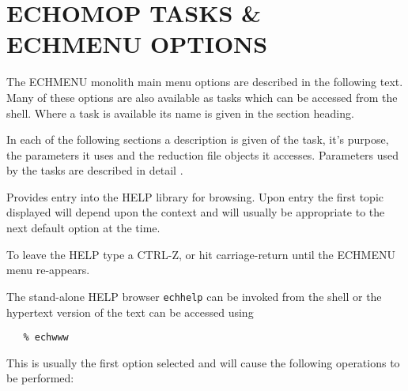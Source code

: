 \section{ECHOMOP TASKS \& ECHMENU OPTIONS}

The ECHMENU monolith main menu options are described in the following text.
Many of these options are also available as tasks which can be
accessed from the shell.  Where a task is available its name is given in the
section heading.

In each of the following sections a description is given of the task, it's
purpose, the parameters it uses and the reduction file objects it accesses.
Parameters used by the tasks are described in detail
\@.



Provides entry into the HELP library for browsing. Upon entry the first
topic displayed will depend upon the context and will usually be
appropriate to the next default option at the time.

To leave the HELP type a CTRL-Z, or hit carriage-return until the
ECHMENU menu re-appears.

The stand-alone HELP browser \verb+echhelp+ can be invoked from the shell
or the hypertext version of the text can be accessed using

\begin{verbatim}
   % echwww
\end{verbatim}



This is usually the first option selected and will cause the following
operations to be performed:

